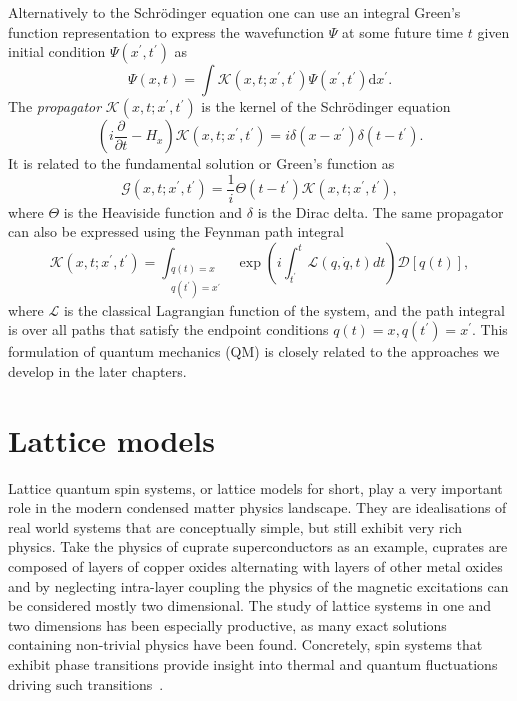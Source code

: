 Alternatively to the Schr\" odinger equation one can use an integral Green's function representation to express the wavefunction $\Psi$ at some future time $t$ given initial condition $\Psi(x^\prime, t^\prime)$ as
\begin{equation}
\Psi\left(x, t\right)=\int  \mathcal{K}\left(x, t ; x^\prime, t^\prime\right) \Psi\left(x^\prime, t^\prime\right) \mathrm{d} x^\prime.
\end{equation}
The \emph{propagator} $\mathcal{K}\left(x, t ; x^\prime, t^\prime\right)$ is the kernel of the Schr\" odinger equation
\begin{equation}
\left(i \frac{\partial}{\partial t}-H_{x}\right) \mathcal{K}\left(x, t ; x^\prime, t^\prime\right)=i \delta\left(x - x^\prime\right) \delta\left(t-t^\prime\right).
\end{equation}
It is related to the fundamental solution or Green's function as
\begin{equation}
\mathcal G\left(x, t ; x^{\prime}, t^{\prime}\right)=\frac{1}{i} \Theta\left(t-t^{\prime}\right) \mathcal K\left(x, t ; x^{\prime}, t^{\prime}\right),
\end{equation}
where $\Theta$ is the Heaviside function and $\delta$ is the Dirac delta. The same propagator can also be expressed using the Feynman path integral
\begin{equation}
\label{eq:FPI}
\mathcal{K}\left(x, t ; x^\prime, t^\prime\right)=\int_{\substack{q(t)=x \\ q(t^\prime)=x^\prime}} \exp \left(i \int_{t^\prime}^{t} \mathcal{L}(q, \dot{q}, t) d t\right)\mathcal{D}[q(t)],
\end{equation}
where $\mathcal{L}$ is the classical Lagrangian function of the system, and the path integral is over all paths that satisfy the endpoint conditions $q(t)=x, q(t^\prime)=x^\prime$. This formulation of quantum mechanics (QM) is closely related to the approaches we develop in the later chapters. 

\section{Lattice models}
\label{sec:lattice-models}
Lattice quantum spin systems, or lattice models for short, play a very important role in the modern condensed matter physics landscape. They are idealisations of real world systems that are conceptually simple, but still exhibit very rich physics. Take the physics of cuprate superconductors as an example, cuprates are composed of layers of copper oxides alternating with layers of other metal oxides and by neglecting intra-layer coupling the physics of the magnetic excitations can be considered mostly two dimensional. The study of lattice systems in one and two dimensions has been especially productive, 
as many exact solutions containing non-trivial physics have been found. Concretely, spin systems that exhibit phase transitions provide insight into thermal and quantum fluctuations driving such transitions~\cite{parkinson2010introduction}.

